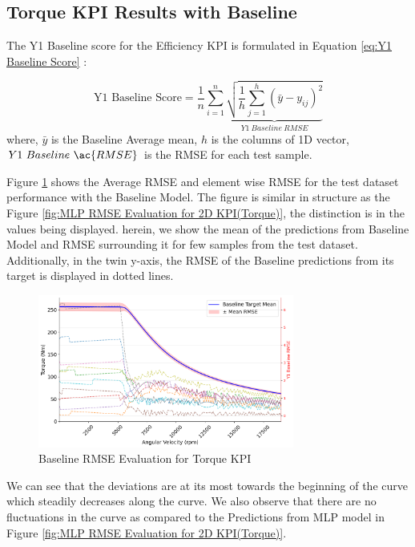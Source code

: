 \documentclass{report} %
\begin{document}
\subsection{Torque \ac{KPI} Results with Baseline}\label{sec:3D Efficiency Grid Results with Baseline}

The Y1 Baseline score for the Efficiency \ac{KPI} is formulated in Equation \ref{eq:Y1 Baseline Score} :

\begin{equation}
    \text{Y1 Baseline Score} = \frac{1}{n} \sum_{i=1}^{n} \underbrace{ \sqrt{\frac{1}{h} \sum_{j=1}^{h} (\bar{y} - y_{ij})^2}}_{Y1\ Baseline\ RMSE}
    \label{eq:Y1 Baseline Score}
\end{equation}
where, \(\bar{y}\) is the Baseline Average mean, \(h\) is the columns of 1D vector, \(Y1\ Baseline\ \ac{RMSE}\) is the \ac{RMSE} for each test sample.

Figure \ref{fig:Baseline RMSE Evaluation for 2D KPI(Torque)} shows the Average \ac{RMSE} and element wise \ac{RMSE} for the test dataset performance with the 
Baseline Model. The figure is similar in structure as the Figure \ref{fig:MLP RMSE Evaluation for 2D KPI(Torque)}, the distinction is in the values being displayed. 
herein, we show the mean of the predictions from Baseline Model and \ac{RMSE} surrounding it for few samples from the test dataset. Additionally, in the twin y-axis, 
the \ac{RMSE} of the Baseline predictions from its target is displayed in dotted lines.

\begin{figure}[H]
    \centering
    \includegraphics[width=0.75\textwidth]{./ReportImages/RMSE_Baseline_y1.png} 
    \caption{Baseline \ac{RMSE} Evaluation for Torque \ac{KPI}} 
    \label{fig:Baseline RMSE Evaluation for 2D KPI(Torque)}
\end{figure}

We can see that the deviations are at its most towards the beginning of the curve which steadily decreases along the curve. We also observe that there are no 
fluctuations in the curve as compared to the Predictions from \ac{MLP} model in Figure \ref{fig:MLP RMSE Evaluation for 2D KPI(Torque)}.
\end{document}
